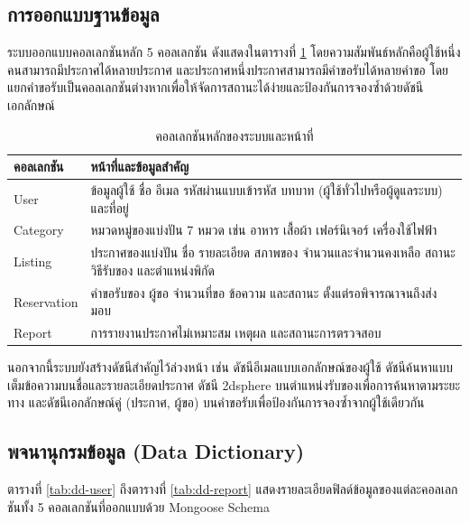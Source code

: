 \documentclass[12pt,a4paper]{report}
\begin{document}
\subsection{การออกแบบฐานข้อมูล}

ระบบออกแบบคอลเลกชันหลัก 5 คอลเลกชัน ดังแสดงในตารางที่ \ref{tab:collections} โดยความสัมพันธ์หลักคือผู้ใช้หนึ่งคนสามารถมีประกาศได้หลายประกาศ และประกาศหนึ่งประกาศสามารถมีคำขอรับได้หลายคำขอ โดยแยกคำขอรับเป็นคอลเลกชันต่างหากเพื่อให้จัดการสถานะได้ง่ายและป้องกันการจองซ้ำด้วยดัชนีเอกลักษณ์

\begin{table}[htbp]
\centering
\caption{คอลเลกชันหลักของระบบและหน้าที่}
\label{tab:collections}
\begin{tabularx}{\textwidth}{l X}
\toprule
\textbf{คอลเลกชัน} & \textbf{หน้าที่และข้อมูลสำคัญ}\\
\midrule
User & ข้อมูลผู้ใช้ ชื่อ อีเมล รหัสผ่านแบบเข้ารหัส บทบาท (ผู้ใช้ทั่วไปหรือผู้ดูแลระบบ) และที่อยู่\\
Category & หมวดหมู่ของแบ่งปัน 7 หมวด เช่น อาหาร เสื้อผ้า เฟอร์นิเจอร์ เครื่องใช้ไฟฟ้า\\
Listing & ประกาศของแบ่งปัน ชื่อ รายละเอียด สภาพของ จำนวนและจำนวนคงเหลือ สถานะ วิธีรับของ และตำแหน่งพิกัด\\
Reservation & คำขอรับของ ผู้ขอ จำนวนที่ขอ ข้อความ และสถานะ ตั้งแต่รอพิจารณาจนถึงส่งมอบ\\
Report & การรายงานประกาศไม่เหมาะสม เหตุผล และสถานะการตรวจสอบ\\
\bottomrule
\end{tabularx}
\end{table}

นอกจากนี้ระบบยังสร้างดัชนีสำคัญไว้ล่วงหน้า เช่น ดัชนีอีเมลแบบเอกลักษณ์ของผู้ใช้ ดัชนีค้นหาแบบเต็มข้อความบนชื่อและรายละเอียดประกาศ ดัชนี 2dsphere บนตำแหน่งรับของเพื่อการค้นหาตามระยะทาง และดัชนีเอกลักษณ์คู่ (ประกาศ, ผู้ขอ) บนคำขอรับเพื่อป้องกันการจองซ้ำจากผู้ใช้เดียวกัน

\subsection{พจนานุกรมข้อมูล (Data Dictionary)}

ตารางที่ \ref{tab:dd-user} ถึงตารางที่ \ref{tab:dd-report} แสดงรายละเอียดฟิลด์ข้อมูลของแต่ละคอลเลกชันทั้ง 5 คอลเลกชันที่ออกแบบด้วย Mongoose Schema
\end{document}
